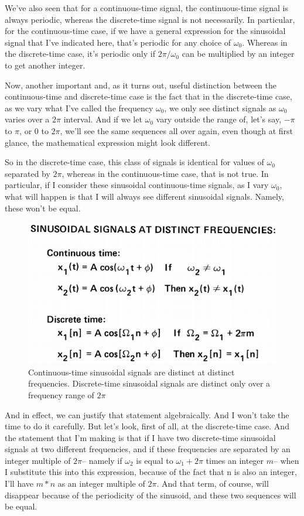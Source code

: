 \documentclass[fleqn,10pt]{olplainarticle}
\theoremstyle{definition}
\theoremstyle{remark}
\begin{document}
We've also seen that for a continuous-time signal, the continuous-time signal is always periodic, whereas the discrete-time signal is not necessarily. In particular, for the continuous-time case, if we have a general expression for the sinusoidal signal that I've indicated here, that's periodic for any choice of $\omega_0$. Whereas in the discrete-time case, it's periodic only if $2 \pi / \omega_0$ can be multiplied by an integer to get another integer.

Now, another important and, as it turns out, useful distinction between the continuous-time and discrete-time case is the fact that in the discrete-time case, as we vary what I've called the frequency $\omega_0$, we only see distinct signals as $\omega_0$ varies over a $2 \pi$ interval. And if we let $\omega_0$ vary outside the range of, let's say, $-\pi$ to $\pi$, or $0$ to $2 \pi$, we'll see the same sequences all over again, even though at first glance, the mathematical expression might look different.

So in the discrete-time case, this class of signals is identical for values of $\omega_0$ separated by $2 \pi$, whereas in the continuous-time case, that is not true. In particular, if I consider these sinusoidal continuous-time signals, as I vary $\omega_0$, what will happen is that I will always see different sinusoidal signals. Namely, these won't be equal.

\begin{figure}[ht]
	\centering
	\includegraphics[width=0.5\linewidth]{images/signals_13.png}
	\caption{Continuous-time sinusoidal signals are distinct at distinct frequencies. Discrete-time sinusoidal signals are distinct only over a frequency range of $2\pi$}
	\label{fig:signals_13}
\end{figure}

And in effect, we can justify that statement algebraically. And I won't take the time to do it carefully. But let's look, first of all, at the discrete-time case. And the statement that I'm making is that if I have two discrete-time sinusoidal signals at two different frequencies, and if these frequencies are separated by an integer multiple of $2 \pi$-- namely if $\omega_2$ is equal to $\omega_1 + 2 \pi$ times an integer $m$-- when I substitute this into this expression, because of the fact that n is also an integer, I'll have $m * n$ as an integer multiple of $2 \pi$. And that term, of course, will disappear because of the periodicity of the sinusoid, and these two sequences will be equal.
\end{document}
